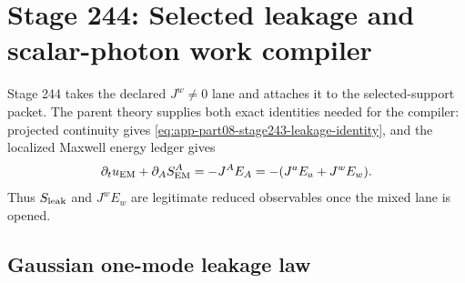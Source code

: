 \section{Stage 244: Selected leakage and scalar-photon work compiler}
\label{sec:app-part08:selected-leakage-and-scalar-photon-work-compiler}
\label{stage:244}


Stage 244 takes the declared \(J^w\neq0\) lane and attaches it to the selected-support packet.  The parent theory supplies both exact identities needed for the compiler: projected continuity gives \cref{eq:app-part08-stage243-leakage-identity}, and the localized Maxwell energy ledger gives
\begin{equation}
\label{eq:app-part08-stage244-em-energy}
\partial_tu_{\rm EM}+\partial_AS_{\rm EM}^{A}
=
-J^AE_A
=-(J^aE_a+J^wE_w).
\end{equation}
Thus \(S_{\rm leak}\) and \(J^wE_w\) are legitimate reduced observables once the mixed lane is opened.

\subsection{Gaussian one-mode leakage law}
\label{subsec:app-part08-stage244-gaussian-leakage}

